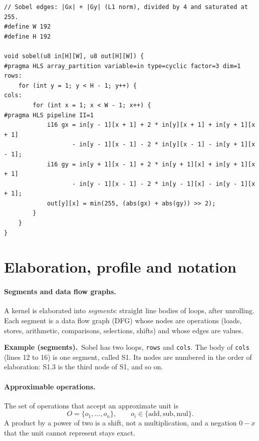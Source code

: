 \documentclass[11pt,a4paper]{article}
\newcommand{\examplebox}[2]{\par\medskip\noindent\colorbox{tabAzul!6}{\begin{minipage}{\dimexpr\linewidth-2\fboxsep}
  \textbf{Example (#1).}\ #2\end{minipage}}\par\medskip}
\begin{document}
\begin{lstlisting}[caption={Sobel kernel (the line numbers are the ones the simulator reports).},label={lst:sobel},float=t]
// Sobel edges: |Gx| + |Gy| (L1 norm), divided by 4 and saturated at 255.
#define W 192
#define H 192

void sobel(u8 in[H][W], u8 out[H][W]) {
#pragma HLS array_partition variable=in type=cyclic factor=3 dim=1
rows:
    for (int y = 1; y < H - 1; y++) {
cols:
        for (int x = 1; x < W - 1; x++) {
#pragma HLS pipeline II=1
            i16 gx = in[y - 1][x + 1] + 2 * in[y][x + 1] + in[y + 1][x + 1]
                   - in[y - 1][x - 1] - 2 * in[y][x - 1] - in[y + 1][x - 1];
            i16 gy = in[y + 1][x - 1] + 2 * in[y + 1][x] + in[y + 1][x + 1]
                   - in[y - 1][x - 1] - 2 * in[y - 1][x] - in[y - 1][x + 1];
            out[y][x] = min(255, (abs(gx) + abs(gy)) >> 2);
        }
    }
}
\end{lstlisting}

\section{Elaboration, profile and notation}\label{sec:elab}

\paragraph{Segments and data flow graphs.} A kernel is elaborated into \emph{segments}: straight line bodies of loops,
after unrolling. Each segment is a data flow graph (DFG) whose nodes are operations (loads, stores, arithmetic,
comparisons, selections, shifts) and whose edges are values.

\examplebox{segments}{Sobel has two loops, \texttt{rows} and \texttt{cols}. The body of \texttt{cols} (lines 12 to 16)
is one segment, called S1. Its nodes are numbered in the order of elaboration: S1.3 is the third node of S1, and so
on.}

\paragraph{Approximable operations.} The set of operations that accept an approximate unit is
\[
  O = \{ o_1, \dots, o_n \}, \qquad o_i \in \{\text{add}, \text{sub}, \text{mul}\}.
\]
A product by a power of two is a shift, not a multiplication, and a negation $0 - x$ that the unit cannot represent
stays exact.
\end{document}
